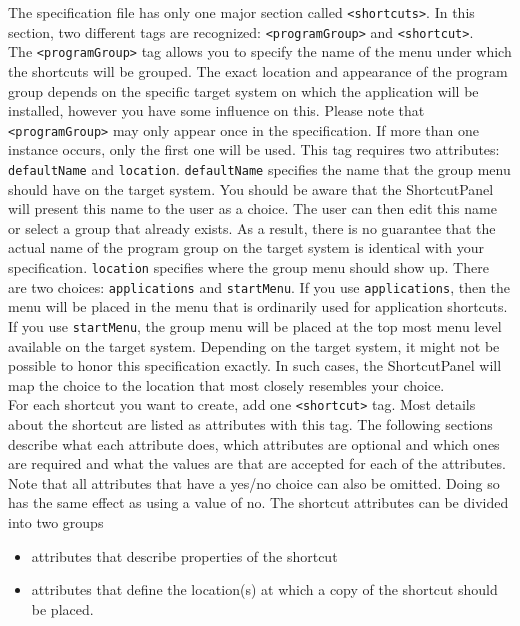 The specification file has only one major section called \texttt{<shortcuts>}.
In this section, two different tags are recognized: \texttt{<programGroup>} and
\texttt{<shortcut>}.\\

The \texttt{<programGroup>} tag allows you to specify the name of the
menu under which the shortcuts will be grouped. The exact location and
appearance of the program group depends on the specific target system on
which the application will be installed, however you have some influence
on this. Please note that \texttt{<programGroup>} may only appear once
in the specification. If more than one instance occurs, only the first
one will be used. This tag requires two attributes: \texttt{defaultName}
and \texttt{location}. \texttt{defaultName} specifies the name that the
group menu should have on the target system. You should be aware that
the ShortcutPanel will present this name to the user as a choice. The
user can then edit this name or select a group that already exists. As a
result, there is no guarantee that the actual name of the program group
on the target system is identical with your specification.
\texttt{location} specifies where the group menu should show up. There
are two choices: \texttt{applications} and \texttt{startMenu}. If you
use \texttt{applications}, then the menu will be placed in the menu that
is ordinarily used for application shortcuts. If you use
\texttt{startMenu}, the group menu will be placed at the top most menu
level available on the target system. Depending on the target system, it
might not be possible to honor this specification exactly. In such
cases, the ShortcutPanel will map the choice to the location that most
closely resembles your choice.\\

For each shortcut you want to create, add one \texttt{<shortcut>} tag.
Most details about the shortcut are listed as attributes with this tag.
The following sections describe what each attribute does, which
attributes are optional and which ones are required and what the values
are that are accepted for each of the attributes. Note that all
attributes that have a yes/no choice can also be omitted. Doing so has
the same effect as using a value of no. The shortcut attributes can be
divided into two groups\\

\begin{itemize}
\item attributes that describe properties of the shortcut
\item attributes that define the location(s) at which a copy of the
      shortcut should be placed.
\end{itemize}\

